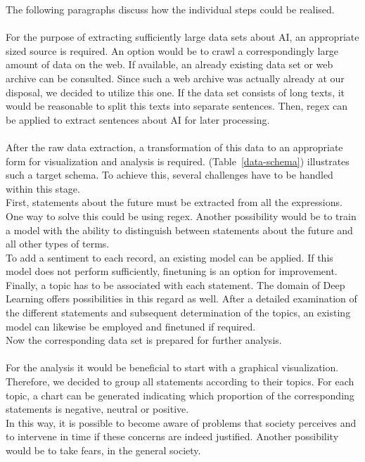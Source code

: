 The following paragraphs discuss how the individual steps could be realised.\\\\
For the purpose of extracting sufficiently large data sets about AI, an appropriate sized source is required.
An option would be to crawl a correspondingly large amount of data on the web.
If available, an already existing data set or web archive can be consulted. 
Since such a web archive was actually already at our disposal, we decided to utilize this one.
If the data set consists of long texts, it would be reasonable to split this texts into separate sentences.
Then, regex can be applied to extract sentences about AI for later processing.\\\\
After the raw data extraction, a transformation of this data to an appropriate form for visualization and analysis is required.
(Table~\ref{data-schema}) illustrates such a target schema.
To achieve this, several challenges have to be handled within this stage. \\
First, statements about the future must be extracted from all the expressions. 
One way to solve this could be using regex. 
Another possibility would be to train a model with the ability to distinguish between statements about the future and all other types of terms.\\
To add a sentiment to each record, an existing model can be applied. 
If this model does not perform sufficiently, finetuning is an option for improvement.\\
Finally, a topic has to be associated with each statement.
The domain of Deep Learning offers possibilities in this regard as well. 
After a detailed examination of the different statements and subsequent determination of the topics, an existing model can likewise be employed and finetuned if required.\\
Now the corresponding data set is prepared for further analysis.\\\\
For the analysis it would be beneficial to start with a graphical visualization.
Therefore, we decided to group all statements according to their topics.
For each topic, a chart can be generated indicating which proportion of the corresponding statements is negative, neutral or positive.\\
In this way, it is possible to become aware of problems that society perceives and to intervene in time if these concerns are indeed justified. Another possibility would be to take fears, in the general society.

